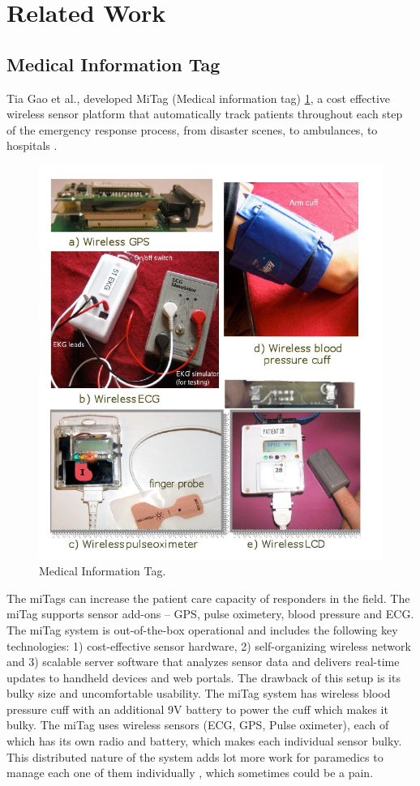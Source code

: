 \section{Related Work}

\subsection{Medical Information Tag}
\hspace{10mm}  Tia Gao et al., developed MiTag (Medical information tag) \ref{fig:miTag}, a cost effective 
wireless sensor platform that automatically track patients 
throughout each step of the emergency response process, from disaster 
scenes, to ambulances, to hospitals \cite{miTag}.
\begin{figure}[h]
	\centering
	\includegraphics[scale = 0.6 ]{miTag.JPG}
	\caption{Medical Information Tag. \cite{miTag}\label{fig:miTag}}
\end{figure}
The miTags can increase 
the patient care capacity of responders in the field. The miTag  supports sensor add-ons – GPS, pulse oximetery, blood pressure and ECG. 
The miTag system is out-of-the-box operational and includes the following key technologies: 1) cost-effective sensor hardware, 2) 
self-organizing wireless network and 3) scalable server software 
that analyzes sensor data and delivers real-time updates to 
handheld devices and web portals. The drawback of this setup is its bulky size and uncomfortable usability. The miTag system has wireless blood pressure cuff with an additional 9V battery to power the cuff which makes it bulky. The miTag uses wireless sensors (ECG, GPS, Pulse oximeter), each of which has its own radio and battery, which makes each individual sensor bulky. This distributed nature of the system adds lot more work for paramedics to manage each one of them individually , which sometimes could be a pain. 

